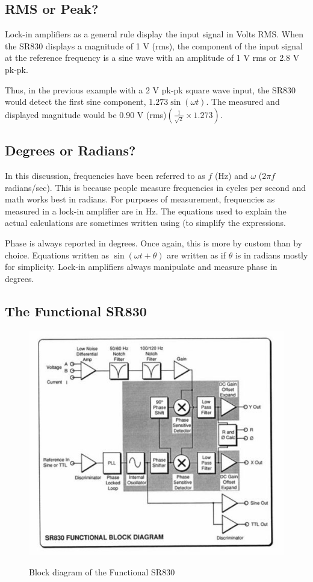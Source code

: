 \documentclass{../lab}
\begin{document}
\subsection{RMS or Peak?}

Lock-in amplifiers as a general rule display the input signal in Volts RMS. When the SR830 displays a magnitude of 1 V (rms), the component of the input signal at the reference frequency is a sine wave with an amplitude of 1 V rms or 2.8 V pk-pk.

Thus, in the previous example with a 2 V pk-pk square wave input, the SR830 would detect the first sine component, $1.273 \sin(\omega t)$. The measured and displayed magnitude would be 0.90 V (rms)$\left(\frac{1}{\sqrt{2}} \times 1.273 \right)$.

\subsection{Degrees or Radians?}

In this discussion, frequencies have been referred to as $f$ (Hz) and $\omega$ ($2 \pi f$ radians/sec). This is because people measure frequencies in cycles per second and math works best in radians. For purposes of measurement, frequencies as measured in a lock-in amplifier are in Hz. The equations used to explain the actual calculations are sometimes written using (to simplify the expressions.

Phase is always reported in degrees. Once again, this is more by custom than by choice. Equations written as $\sin(\omega t + \theta)$ are written as if $\theta$ is in radians mostly for simplicity. Lock-in amplifiers always manipulate and measure phase in degrees.

\subsection{The Functional SR830}

\begin{figure}[h]
    \centering
    \href{http://experimentationlab.berkeley.edu/sites/default/files/images/500px-NMR34.jpg}{\includegraphics[width=0.65\linewidth]{images/500px-NMR34.jpg}}
    \caption{Block diagram of the Functional SR830}
    \label{fig:500px-NMR34}
\end{figure}
\end{document}
